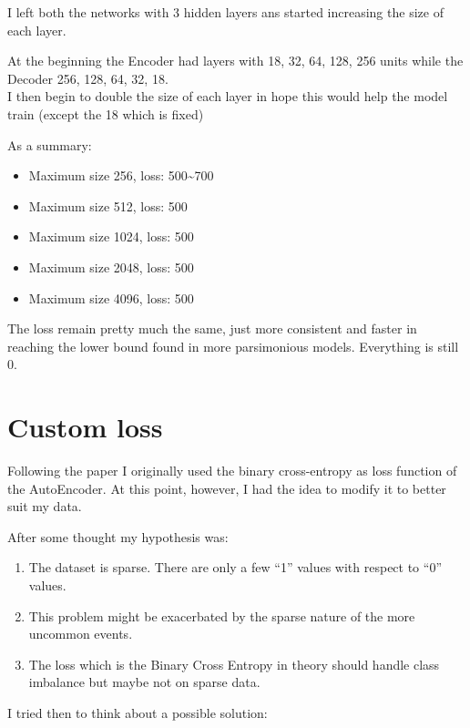 \documentclass[
  letterpaper,
  DIV=11,
  numbers=noendperiod]{scrreprt}
\providecommand{\tightlist}{%
  \setlength{\itemsep}{0pt}\setlength{\parskip}{0pt}}\usepackage{longtable,booktabs,array}
\begin{document}
I left both the networks with 3 hidden layers ans started increasing the
size of each layer.

At the beginning the Encoder had layers with 18, 32, 64, 128, 256 units
while the Decoder 256, 128, 64, 32, 18.\\
I then begin to double the size of each layer in hope this would help
the model train (except the 18 which is fixed)

As a summary:

\begin{itemize}
\tightlist
\item
  Maximum size 256, loss: 500\textasciitilde700
\item
  Maximum size 512, loss: 500
\item
  Maximum size 1024, loss: 500
\item
  Maximum size 2048, loss: 500
\item
  Maximum size 4096, loss: 500
\end{itemize}

The loss remain pretty much the same, just more consistent and faster in
reaching the lower bound found in more parsimonious models. Everything
is still 0.

\hypertarget{custom-loss}{%
\chapter{Custom loss}\label{custom-loss}}

Following the paper I originally used the binary cross-entropy as loss
function of the AutoEncoder. At this point, however, I had the idea to
modify it to better suit my data.

After some thought my hypothesis was:

\begin{enumerate}
\def\labelenumi{\arabic{enumi}.}
\tightlist
\item
  The dataset is sparse. There are only a few ``1'' values with respect
  to ``0'' values.
\item
  This problem might be exacerbated by the sparse nature of the more
  uncommon events.
\item
  The loss which is the Binary Cross Entropy in theory should handle
  class imbalance but maybe not on sparse data.
\end{enumerate}

I tried then to think about a possible solution:
\end{document}
